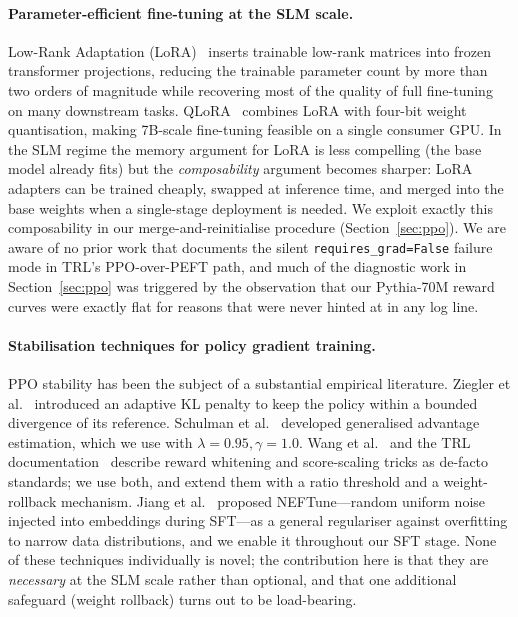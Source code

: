 \documentclass[10pt,twocolumn,letterpaper]{article}
\begin{document}
\paragraph{Parameter-efficient fine-tuning at the SLM scale.}
Low-Rank Adaptation (LoRA)~\cite{hu2021lora,hu2022lora} inserts trainable low-rank matrices into frozen transformer projections, reducing the trainable parameter count by more than two orders of magnitude while recovering most of the quality of full fine-tuning on many downstream tasks. QLoRA~\cite{dettmers2023qlora} combines LoRA with four-bit weight quantisation, making 7B-scale fine-tuning feasible on a single consumer GPU. In the SLM regime the memory argument for LoRA is less compelling (the base model already fits) but the \emph{composability} argument becomes sharper: LoRA adapters can be trained cheaply, swapped at inference time, and merged into the base weights when a single-stage deployment is needed. We exploit exactly this composability in our merge-and-reinitialise procedure (Section~\ref{sec:ppo}). We are aware of no prior work that documents the silent \texttt{requires\_grad=False} failure mode in TRL's PPO-over-PEFT path, and much of the diagnostic work in Section~\ref{sec:ppo} was triggered by the observation that our Pythia-70M reward curves were exactly flat for reasons that were never hinted at in any log line.

\paragraph{Stabilisation techniques for policy gradient training.}
PPO stability has been the subject of a substantial empirical literature. Ziegler et al.~\cite{ziegler2019fine} introduced an adaptive KL penalty to keep the policy within a bounded divergence of its reference. Schulman et al.~\cite{schulman2015high} developed generalised advantage estimation, which we use with $\lambda=0.95,\gamma=1.0$. Wang et al.~\cite{wang2024openchat} and the TRL documentation~\cite{vonwerra2022trl} describe reward whitening and score-scaling tricks as de-facto standards; we use both, and extend them with a ratio threshold and a weight-rollback mechanism. Jiang et al.~\cite{jiang2023neftune} proposed NEFTune---random uniform noise injected into embeddings during SFT---as a general regulariser against overfitting to narrow data distributions, and we enable it throughout our SFT stage. None of these techniques individually is novel; the contribution here is that they are \emph{necessary} at the SLM scale rather than optional, and that one additional safeguard (weight rollback) turns out to be load-bearing.
\end{document}
